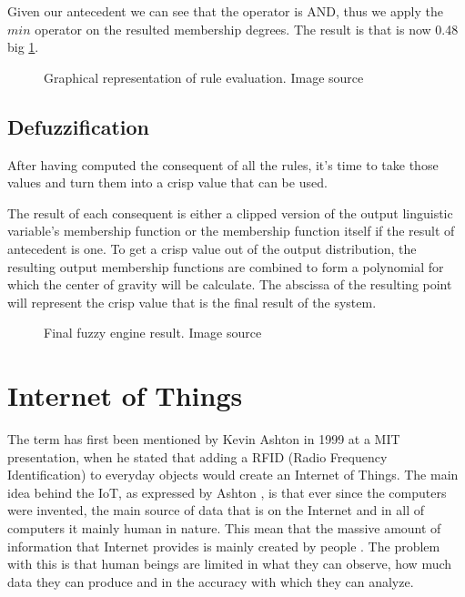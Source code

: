 Given our antecedent  we can see that the operator is AND, thus we
apply the $min$ operator on the resulted membership degrees. The result is that  is now 0.48 big
\ref{fig:rule_eval}.

\begin{figure}[h!]
    \centerline{}
    \caption[Graphical representation of rule evaluation]{Graphical representation of rule evaluation.
                                                          Image source \cite{website:fuzzy_ctr_sys}}
\label{fig:rule_eval}
\end{figure}

\subsection{Defuzzification}

\qquad After having computed the consequent of all the rules, it's time to take those values and turn them
into a crisp value that can be used.

\quad The result of each consequent is either a clipped version of the output linguistic variable's
membership function or the membership function itself if the result of antecedent is one.
To get a crisp value out of the output distribution, the resulting output membership functions are combined
to form a polynomial for which the center of gravity will be calculate. The abscissa of the resulting point
will represent the crisp value that is the final result of the system.

\begin{figure}[h!]
    \centerline{}
    \caption[Final fuzzy engine result]{Final fuzzy engine result. Image source \cite{website:fuzzy_ctr_sys}}
\label{fig:final_res}
\end{figure}

\section{Internet of Things}

The term  has first been mentioned by Kevin Ashton in 1999 at a MIT presentation, when
he stated that adding a RFID (Radio Frequency Identification) to everyday objects would create an Internet
of Things. The main idea behind the IoT, as expressed by Ashton \cite{IoTThing}, is that ever since the
computers were invented, the main source of data that is on the Internet and in all of computers it mainly
human in nature. This mean that the massive amount of information that Internet provides is mainly created
by people 
\cite{IoTThing}. The problem with this is that human beings are limited in what they can observe, how much
data they can produce and in the accuracy with which they can analyze.

